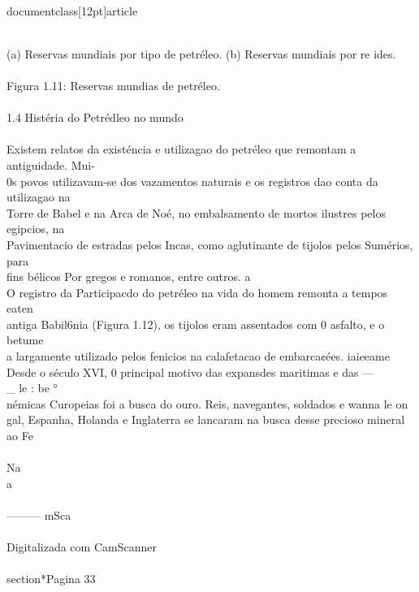 \\documentclass[12pt]{article}
\begin{document}
{\\
(a) Reservas mundiais por tipo de petréleo. (b) Reservas mundiais por re ides.\\
\\
Figura 1.11: Reservas mundias de petréleo.\\
\\
1.4 Histéria do Petrédleo no mundo\\
\\
Existem relatos da existéncia e utilizagao do petréleo que remontam a antiguidade. Mui-\\
0s povos utilizavam-se dos vazamentos naturais e os registros dao conta da utilizagao na\\
Torre de Babel e na Arca de Noé, no embalsamento de mortos ilustres pelos egipcios, na\\
Pavimentacio de estradas pelos Incas, como aglutinante de tijolos pelos Sumérios, para\\
fins bélicos Por gregos e romanos, entre outros. a\\
O registro da Participacdo do petréleo na vida do homem remonta a tempos eaten\\
antiga Babil6nia (Figura 1.12), os tijolos eram assentados com 0 asfalto, e o betume\\
a largamente utilizado pelos fenicios na calafetacao de embarca¢ées. iaieeame\\
Desde o século XVI, 0 principal motivo das expansdes maritimas e das —\\_ le : be °\\
némicas Curopeias foi a busca do ouro. Reis, navegantes, soldados e wanna le on\\
gal, Espanha, Holanda e Inglaterra se lancaram na busca desse precioso mineral ao Fe\\
\\
Na\\
a\\
\\
——— mSca\\
\\
Digitalizada com CamScanner\\

\\section*{Pagina 33}

}
\end{document}
